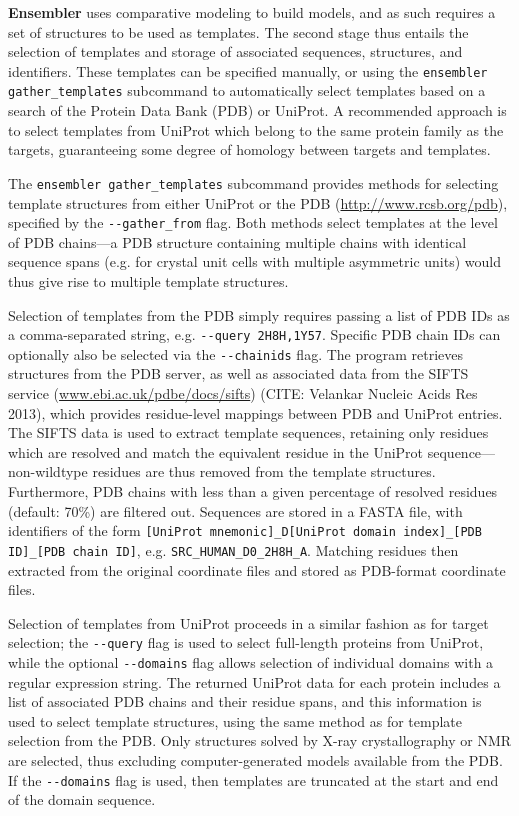 \documentclass[aps,pre,twocolumn,nofootinbib,superscriptaddress,linenumbers]{revtex4-1}
\begin{document}
{\bf Ensembler} uses comparative modeling to build models, and as such requires a set of structures to be used as templates.
The second stage thus entails the selection of templates and storage of associated sequences, structures, and identifiers.
These templates can be specified manually, or using the {\tt ensembler gather\_templates} subcommand to automatically select templates based on a search of the Protein Data Bank (PDB) or UniProt.
A recommended approach is to select templates from UniProt which belong to the same protein family as the targets, guaranteeing some degree of homology between targets and templates.

The {\tt ensembler gather\_templates} subcommand provides methods for selecting template structures from either UniProt or the PDB (\url{http://www.rcsb.org/pdb}), specified by the {\tt -{}-gather\_from} flag.
Both methods select templates at the level of PDB chains---a PDB structure containing multiple chains with identical sequence spans (e.g. for crystal unit cells with multiple asymmetric units) would thus give rise to multiple template structures.

Selection of templates from the PDB simply requires passing a list of PDB IDs as a comma-separated string, e.g. {\tt -{}-query 2H8H,1Y57}.
Specific PDB chain IDs can optionally also be selected via the {\tt -{}-chainids} flag.
The program retrieves structures from the PDB server, as well as associated data from the SIFTS service (\href{http://www.ebi.ac.uk/pdbe/docs/sifts/}{www.ebi.ac.uk/pdbe/docs/sifts}) (CITE: Velankar Nucleic Acids Res 2013), which provides residue-level mappings between PDB and UniProt entries.
The SIFTS data is used to extract template sequences, retaining only residues which are resolved and match the equivalent residue in the UniProt sequence---non-wildtype residues are thus removed from the template structures.
Furthermore, PDB chains with less than a given percentage of resolved residues (default: 70\%) are filtered out.
Sequences are stored in a FASTA file, with identifiers of the form {\tt [UniProt mnemonic]\_D[UniProt domain index]\_[PDB ID]\_[PDB chain ID]}, e.g. {\tt SRC\_HUMAN\_D0\_2H8H\_A}.
Matching residues then extracted from the original coordinate files and stored as PDB-format coordinate files.

Selection of templates from UniProt proceeds in a similar fashion as for target selection; the {\tt -{}-query} flag is used to select full-length proteins from UniProt, while the optional {\tt -{}-domains} flag allows selection of individual domains with a regular expression string.
The returned UniProt data for each protein includes a list of associated PDB chains and their residue spans, and this information is used to select template structures, using the same method as for template selection from the PDB.
Only structures solved by X-ray crystallography or NMR are selected, thus excluding computer-generated models available from the PDB.
If the {\tt -{}-domains} flag is used, then templates are truncated at the start and end of the domain sequence.
\end{document}
